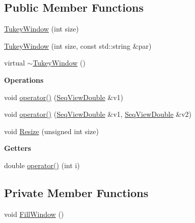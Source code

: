 \subsection*{Public Member Functions}
\begin{DoxyCompactItemize}
\item 
\hyperlink{classtsa_1_1_tukey_window_a89a3f0600e965141831da4dd53e2d9e6}{Tukey\+Window} (int size)
\item 
\hyperlink{classtsa_1_1_tukey_window_a4931ad836232c2620337127bade405d0}{Tukey\+Window} (int size, const std\+::string \&par)
\item 
virtual \hyperlink{classtsa_1_1_tukey_window_afa847725559d456b9088f5b83023571e}{$\sim$\+Tukey\+Window} ()
\end{DoxyCompactItemize}
\begin{Indent}\textbf{ Operations}\par
\begin{DoxyCompactItemize}
\item 
void \hyperlink{classtsa_1_1_tukey_window_a3a68173adce5cbbebefbadb0d7084847}{operator()} (\hyperlink{namespacetsa_ac599574bcc094eda25613724b8f3ca9e}{Seq\+View\+Double} \&v1)
\item 
void \hyperlink{classtsa_1_1_tukey_window_ad38a8c9b6fa12b65d3f7c7b37f4b19a8}{operator()} (\hyperlink{namespacetsa_ac599574bcc094eda25613724b8f3ca9e}{Seq\+View\+Double} \&v1, \hyperlink{namespacetsa_ac599574bcc094eda25613724b8f3ca9e}{Seq\+View\+Double} \&v2)
\item 
void \hyperlink{classtsa_1_1_tukey_window_acfb62239e47e5faa44210407c7c7f42f}{Resize} (unsigned int size)
\end{DoxyCompactItemize}
\end{Indent}
\begin{Indent}\textbf{ Getters}\par
\begin{DoxyCompactItemize}
\item 
double \hyperlink{classtsa_1_1_tukey_window_ac80a795dfbcbc13f4decff6334b1be1a}{operator()} (int i)
\end{DoxyCompactItemize}
\end{Indent}
\subsection*{Private Member Functions}
\begin{DoxyCompactItemize}
\item 
void \hyperlink{classtsa_1_1_tukey_window_a9c44b527df2c303511322face00a5d33}{Fill\+Window} ()
\end{DoxyCompactItemize}
